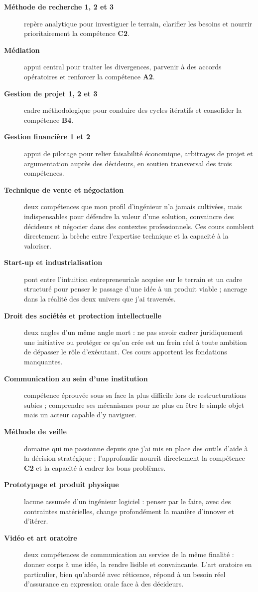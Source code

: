 \begin{description}
    \item[\textbf{Méthode de recherche 1, 2 et 3}] repère analytique pour investiguer le terrain, clarifier les besoins et nourrir prioritairement la compétence \textbf{C2}.
    \item[\textbf{Médiation}] appui central pour traiter les divergences, parvenir à des accords opératoires et renforcer la compétence \textbf{A2}.
    \item[\textbf{Gestion de projet 1, 2 et 3}] cadre méthodologique pour conduire des cycles itératifs et consolider la compétence \textbf{B4}.
    \item[\textbf{Gestion financière 1 et 2}] appui de pilotage pour relier faisabilité économique, arbitrages de projet et argumentation auprès des décideurs, en soutien transversal des trois compétences.
    \item[\textbf{Technique de vente et négociation}] deux compétences que mon profil d'ingénieur n'a jamais cultivées, mais indispensables pour défendre la valeur d'une solution, convaincre des décideurs et négocier dans des contextes professionnels. Ces cours comblent directement la brèche entre l'expertise technique et la capacité à la valoriser.
    \item[\textbf{Start-up et industrialisation}] pont entre l'intuition entrepreneuriale acquise sur le terrain et un cadre structuré pour penser le passage d'une idée à un produit viable ; ancrage dans la réalité des deux univers que j'ai traversés.
    \item[\textbf{Droit des sociétés et protection intellectuelle}] deux angles d'un même angle mort : ne pas savoir cadrer juridiquement une initiative ou protéger ce qu'on crée est un frein réel à toute ambition de dépasser le rôle d'exécutant. Ces cours apportent les fondations manquantes.
    \item[\textbf{Communication au sein d'une institution}] compétence éprouvée sous sa face la plus difficile lors de restructurations subies ; comprendre ses mécanismes pour ne plus en être le simple objet mais un acteur capable d'y naviguer.
    \item[\textbf{Méthode de veille}] domaine qui me passionne depuis que j'ai mis en place des outils d'aide à la décision stratégique ; l'approfondir nourrit directement la compétence \textbf{C2} et la capacité à cadrer les bons problèmes.
    \item[\textbf{Prototypage et produit physique}] lacune assumée d'un ingénieur logiciel : penser par le faire, avec des contraintes matérielles, change profondément la manière d'innover et d'itérer.
    \item[\textbf{Vidéo et art oratoire}] deux compétences de communication au service de la même finalité : donner corps à une idée, la rendre lisible et convaincante. L'art oratoire en particulier, bien qu'abordé avec réticence, répond à un besoin réel d'assurance en expression orale face à des décideurs.
\end{description}

